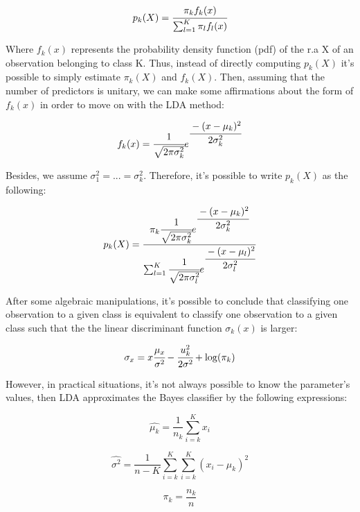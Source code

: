 \documentclass[conference]{IEEEtran}
\begin{document}
\begin{equation}
    p_k(X) = \cfrac{\pi_k f_k(x)}{\sum^{K}_{l=1}\pi_lf_l(x)} \label{eq6}
\end{equation}

Where $f_k(x)$ represents the probability density function (pdf) of the r.a X of 
an observation belonging to class K. Thus, instead of directly computing $p_k(X)$ it's 
possible to simply estimate $\pi_k(X)$ and $f_k(X)$. Then, assuming that the number of 
predictors is unitary, we can make some affirmations about the form of $f_k(x)$ in order
to move on with the LDA method:

\begin{equation}
    f_k(x) = \cfrac{1}{\sqrt{2\pi\sigma^2_k}}e^{\cfrac{-(x-\mu_k)^2}{2\sigma^2_k}} \label{eq7}
\end{equation}

Besides, we assume $\sigma_1^2=...=\sigma_k^2$. Therefore, it's possible to write $p_k(X)$ 
as the following:

\begin{equation}
    p_k(X) = \cfrac{\pi_k \cfrac{1}{\sqrt{2\pi\sigma^2_k}}e^{\cfrac{-(x-\mu_k)^2}{2\sigma^2_k}}}{\sum^K_{l=1}\cfrac{1}{\sqrt{2\pi\sigma^2_l}}e^{\cfrac{-(x-\mu_l)^2}{2\sigma^2_l}}} \label{eq8}
\end{equation}

After some algebraic manipulations, it's possible to conclude that classifying one
observation to a given class is equivalent to classify one observation to a given class 
such that the the linear discriminant function $\sigma_k(x)$ is larger:

\begin{equation}
    \sigma_x = x\cfrac{\mu_x}{\sigma^2} - \cfrac{u_k^2}{2\sigma^2} + \log(\pi_k) \label{eq9}
\end{equation}

However, in practical situations, it's not always possible to know the parameter's values,
then LDA approximates the Bayes classifier by the following expressions:

\begin{equation}
    \hat{\mu_k} = \frac{1}{n_k} \sum^K_{i = k} x_i \label{eq10}
\end{equation}

\begin{equation}
    \hat{\sigma^2} = \frac{1}{n-K} \sum^K_{i = k} \sum^K_{i = k} (x_i-\hat{\mu_k})^2 \label{eq11}
\end{equation}

\begin{equation}
    \pi_k = \frac{n_k}{n}\label{eq12}
\end{equation}
\end{document}
